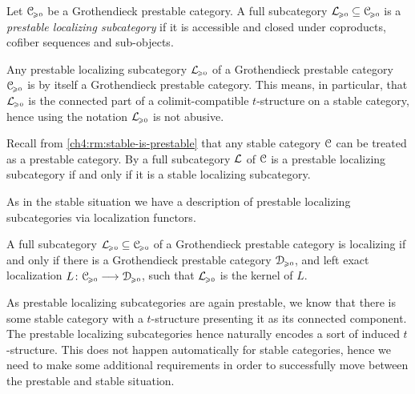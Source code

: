\begin{definition}
    Let $\EuScript{C}_{\hspace{-1pt}\scriptscriptstyle\geqslant 0}$ be a Grothendieck prestable category. A full subcategory $\mathcal{L}_{\hspace{-1pt}\scriptscriptstyle\geqslant 0}\subseteq \EuScript{C}_{\hspace{-1pt}\scriptscriptstyle\geqslant 0}$ is a \emph{prestable localizing subcategory} if it is accessible and closed under coproducts, cofiber sequences and sub-objects. 
\end{definition}

\begin{remark}
    \label{ch4:rm:prestable-localizing-is-Grothendieck}
    Any prestable localizing subcategory $\mathcal{L}_{\hspace{-1pt}\scriptscriptstyle\geqslant 0}$ of a Grothendieck prestable category $\EuScript{C}_{\hspace{-1pt}\scriptscriptstyle\geqslant 0}$ is by \cite[C.5.2.1]{lurie_SAG} itself a Grothendieck prestable category. This means, in particular, that $\mathcal{L}_{\hspace{-1pt}\scriptscriptstyle\geqslant 0}$ is the connected part of a colimit-compatible $t$-structure on a stable category, hence using the notation $\mathcal{L}_{\hspace{-1pt}\scriptscriptstyle\geqslant 0}$ is not abusive. 
\end{remark}

\begin{remark}
    \label{ch4:rm:prestable-localizing-in-stable-then-stable-localizing}
    Recall from \cref{ch4:rm:stable-is-prestable} that any stable category $\EuScript{C}$ can be treated as a prestable category. By \cite[C.2.3.6]{lurie_SAG} a full subcategory $\mathcal{L}$ of $\EuScript{C}$ is a prestable localizing subcategory if and only if it is a stable localizing subcategory. 
\end{remark}

As in the stable situation we have a description of prestable localizing subcategories via localization functors. 

\begin{proposition}
    \label{ch4:prop:Lurie-prestable-localizing-left-exact-functor}
    A full subcategory $\mathcal{L}_{\hspace{-1pt}\scriptscriptstyle\geqslant 0}\subseteq \EuScript{C}_{\hspace{-1pt}\scriptscriptstyle\geqslant 0}$ of a Grothendieck prestable category is localizing if and only if there is a Grothendieck prestable category $\EuScript{D}_{\hspace{-1pt}\scriptscriptstyle\geqslant 0}$, and left exact localization $L\colon\EuScript{C}_{\hspace{-1pt}\scriptscriptstyle\geqslant 0}\longrightarrow\EuScript{D}_{\hspace{-1pt}\scriptscriptstyle\geqslant 0}$, such that $\mathcal{L}_{\hspace{-1pt}\scriptscriptstyle\geqslant 0}$ is the kernel of $L$. 
\end{proposition}















As prestable localizing subcategories are again prestable, we know that there is some stable category with a $t$-structure presenting it as its connected component. The prestable localizing subcategories hence naturally encodes a sort of induced $t$-structure. This does not happen automatically for stable categories, hence we need to make some additional requirements in order to successfully move between the prestable and stable situation. 

